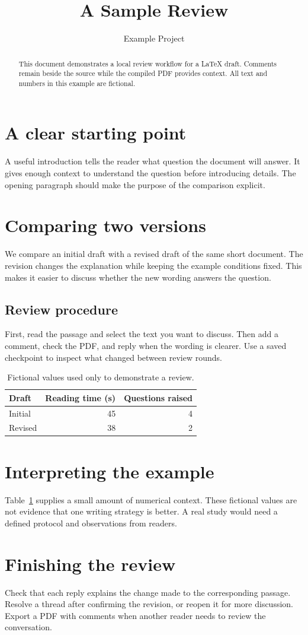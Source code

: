 \documentclass[11pt]{article}
\title{A Sample Review}
\author{Example Project}
\date{}
\begin{document}
\maketitle

\begin{abstract}
This document demonstrates a local review workflow for a LaTeX draft.
Comments remain beside the source while the compiled PDF provides context.
All text and numbers in this example are fictional.
\end{abstract}

\section{A clear starting point}
A useful introduction tells the reader what question the document will answer.
It gives enough context to understand the question before introducing details.
The opening paragraph should make the purpose of the comparison explicit.

\section{Comparing two versions}
We compare an initial draft with a revised draft of the same short document.
The revision changes the explanation while keeping the example conditions fixed.
This makes it easier to discuss whether the new wording answers the question.

\subsection{Review procedure}
First, read the passage and select the text you want to discuss.
Then add a comment, check the PDF, and reply when the wording is clearer.
Use a saved checkpoint to inspect what changed between review rounds.

\begin{table}[ht]
\centering
\caption{Fictional values used only to demonstrate a review.}
\label{tab:example}
\begin{tabular}{lrr}
\hline
Draft & Reading time (s) & Questions raised \\
\hline
Initial & 45 & 4 \\
Revised & 38 & 2 \\
\hline
\end{tabular}
\end{table}

\section{Interpreting the example}
Table~\ref{tab:example} supplies a small amount of numerical context.
These fictional values are not evidence that one writing strategy is better.
A real study would need a defined protocol and observations from readers.

\newpage
\section{Finishing the review}
Check that each reply explains the change made to the corresponding passage.
Resolve a thread after confirming the revision, or reopen it for more discussion.
Export a PDF with comments when another reader needs to review the conversation.
\end{document}
